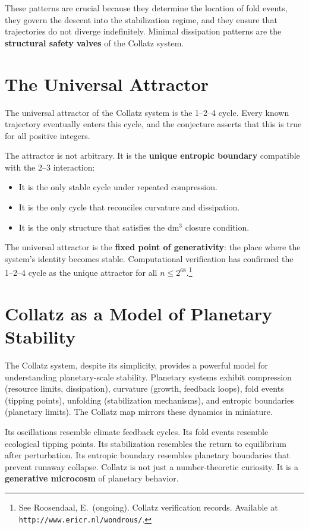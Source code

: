 \documentclass[14pt, twoside, openright]{book}
\theoremstyle{definition}
\theoremstyle{remark}
\begin{document}
These patterns are crucial because they determine the location of fold events,
they govern the descent into the stabilization regime, and they ensure that
trajectories do not diverge indefinitely. Minimal dissipation patterns are the
\textbf{structural safety valves} of the Collatz system.

\section{The Universal Attractor}

The universal attractor of the Collatz system is the 1--2--4 cycle. Every known
trajectory eventually enters this cycle, and the conjecture asserts that this is
true for all positive integers.

The attractor is not arbitrary. It is the \textbf{unique entropic boundary}
compatible with the 2--3 interaction:

\begin{itemize}[leftmargin=2em]
  \item It is the only stable cycle under repeated compression.
  \item It is the only cycle that reconciles curvature and dissipation.
  \item It is the only structure that satisfies the dm$^{3}$ closure condition.
\end{itemize}

The universal attractor is the \textbf{fixed point of generativity}: the place
where the system's identity becomes stable. Computational verification has
confirmed the 1--2--4 cycle as the unique attractor for all $n \leq 2^{68}$.\footnote{See
Roosendaal, E.\ (ongoing). Collatz verification records. Available at
\texttt{http://www.ericr.nl/wondrous/}.}

\section{Collatz as a Model of Planetary Stability}

The Collatz system, despite its simplicity, provides a powerful model for
understanding planetary-scale stability. Planetary systems exhibit compression
(resource limits, dissipation), curvature (growth, feedback loops), fold events
(tipping points), unfolding (stabilization mechanisms), and entropic boundaries
(planetary limits). The Collatz map mirrors these dynamics in miniature.

Its oscillations resemble climate feedback cycles. Its fold events resemble
ecological tipping points. Its stabilization resembles the return to equilibrium
after perturbation. Its entropic boundary resembles planetary boundaries that
prevent runaway collapse. Collatz is not just a number-theoretic curiosity. It
is a \textbf{generative microcosm} of planetary behavior.
\end{document}
